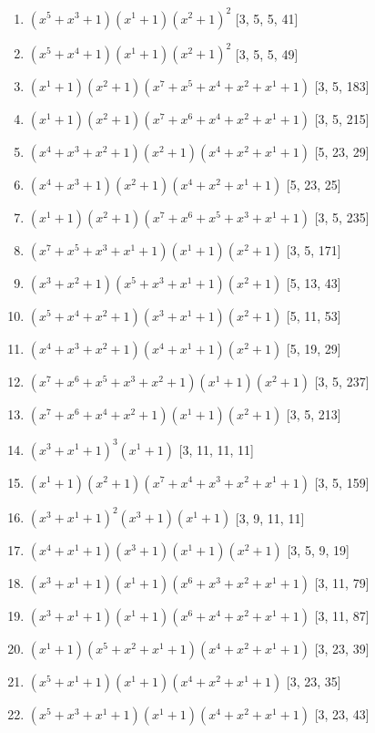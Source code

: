 \documentclass[10pt,twocolumn]{article}
\begin{document}
\begin{enumerate}
\item $(x^{5} + x^{3} + 1)(x^{1} + 1)(x^{2} + 1)^{2}$  [3, 5, 5, 41]
\item $(x^{5} + x^{4} + 1)(x^{1} + 1)(x^{2} + 1)^{2}$  [3, 5, 5, 49]
\item $(x^{1} + 1)(x^{2} + 1)(x^{7} + x^{5} + x^{4} + x^{2} + x^{1} + 1)$  [3, 5, 183]
\item $(x^{1} + 1)(x^{2} + 1)(x^{7} + x^{6} + x^{4} + x^{2} + x^{1} + 1)$  [3, 5, 215]
\item $(x^{4} + x^{3} + x^{2} + 1)(x^{2} + 1)(x^{4} + x^{2} + x^{1} + 1)$  [5, 23, 29]
\item $(x^{4} + x^{3} + 1)(x^{2} + 1)(x^{4} + x^{2} + x^{1} + 1)$  [5, 23, 25]
\item $(x^{1} + 1)(x^{2} + 1)(x^{7} + x^{6} + x^{5} + x^{3} + x^{1} + 1)$  [3, 5, 235]
\item $(x^{7} + x^{5} + x^{3} + x^{1} + 1)(x^{1} + 1)(x^{2} + 1)$  [3, 5, 171]
\item $(x^{3} + x^{2} + 1)(x^{5} + x^{3} + x^{1} + 1)(x^{2} + 1)$  [5, 13, 43]
\item $(x^{5} + x^{4} + x^{2} + 1)(x^{3} + x^{1} + 1)(x^{2} + 1)$  [5, 11, 53]
\item $(x^{4} + x^{3} + x^{2} + 1)(x^{4} + x^{1} + 1)(x^{2} + 1)$  [5, 19, 29]
\item $(x^{7} + x^{6} + x^{5} + x^{3} + x^{2} + 1)(x^{1} + 1)(x^{2} + 1)$  [3, 5, 237]
\item $(x^{7} + x^{6} + x^{4} + x^{2} + 1)(x^{1} + 1)(x^{2} + 1)$  [3, 5, 213]
\item $(x^{3} + x^{1} + 1)^{3}(x^{1} + 1)$  [3, 11, 11, 11]
\item $(x^{1} + 1)(x^{2} + 1)(x^{7} + x^{4} + x^{3} + x^{2} + x^{1} + 1)$  [3, 5, 159]
\item $(x^{3} + x^{1} + 1)^{2}(x^{3} + 1)(x^{1} + 1)$  [3, 9, 11, 11]
\item $(x^{4} + x^{1} + 1)(x^{3} + 1)(x^{1} + 1)(x^{2} + 1)$  [3, 5, 9, 19]
\item $(x^{3} + x^{1} + 1)(x^{1} + 1)(x^{6} + x^{3} + x^{2} + x^{1} + 1)$  [3, 11, 79]
\item $(x^{3} + x^{1} + 1)(x^{1} + 1)(x^{6} + x^{4} + x^{2} + x^{1} + 1)$  [3, 11, 87]
\item $(x^{1} + 1)(x^{5} + x^{2} + x^{1} + 1)(x^{4} + x^{2} + x^{1} + 1)$  [3, 23, 39]
\item $(x^{5} + x^{1} + 1)(x^{1} + 1)(x^{4} + x^{2} + x^{1} + 1)$  [3, 23, 35]
\item $(x^{5} + x^{3} + x^{1} + 1)(x^{1} + 1)(x^{4} + x^{2} + x^{1} + 1)$  [3, 23, 43]

\end{enumerate}
\end{document}
